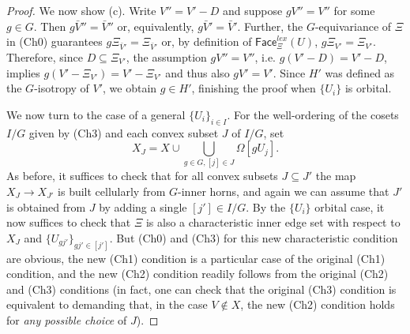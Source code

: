 \documentclass[a4paper,10pt,draft]{article}%
\numberwithin{equation}{section}%
\numberwithin{figure}{section}
\begin{document}
\begin{proof}
We now show (c). Write $V''=V'-D$ and suppose $gV'' = V''$ for some $g \in G$.
Then $g\bar{V}'' = \bar{V}''$ or, equivalently, 
$g\bar{V}' = \bar{V}'$.
Further, the $G$-equivariance of $\Xi$ in (Ch0)
guarantees $g \Xi_{\bar{V}'} = \Xi_{\bar{V}'}$ or, by definition of $\mathsf{Face}_{\Xi}^{lex}(U)$, 
$g \Xi_{V'} = \Xi_{V'}$. 
Therefore, since $D \subseteq \Xi_{V'}$,
the assumption $gV'' = V''$, i.e.
$g(V'-D) = V'-D$,
implies 
$g(V'-\Xi_{V'}) = V'-\Xi_{V'}$
and thus also $g V' = V'$. 
Since $H'$ was defined as the $G$-isotropy of $V'$,
we obtain $g \in H'$, finishing the proof when $\{U_i\}$ is orbital.

We now turn to the case of a general $\{U_i\}_{i \in I}$.
For the well-ordering of the cosets $I/G$ given by (Ch3)
and each convex subset $J$ of $I/G$, set
\[
	X_J = 
	X \cup \bigcup_{g\in G,[j] \in J} \Omega[g U_j].
\]
As before, it suffices to check that for all convex subsets
$J \subseteq J'$
the map $X_J \to X_{J'}$ is built cellularly from $G$-inner horns,
and again we can assume that $J'$ is obtained from $J$ by adding a single $[j'] \in I/G$.
By the $\{U_i\}$ orbital case, 
it now suffices to check that
$\Xi$ is also a characteristic inner edge set with respect to 
$X_J$ and $\{U_{g j'}\}_{g j' \in [j']}$.
But (Ch0) and (Ch3) for this new characteristic condition are obvious,
the new (Ch1) condition is a particular case of the original (Ch1) condition, 
and the new (Ch2) condition readily follows from the original (Ch2) and (Ch3) conditions
(in fact, one can check that the original (Ch3) condition is equivalent to
demanding that, in the case $V\not \in X$, 
the new (Ch2) condition holds for \textit{any possible choice} of $J$).
\end{proof}
\end{document}
